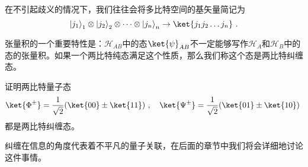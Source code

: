 在不引起歧义的情况下，我们往往会将多比特空间的基矢量简记为$$\left|j_1\right\rangle_1 \otimes\left|j_2\right\rangle_2 \otimes \cdots \otimes\left|j_n\right\rangle_n\to \ket{j_1j_2\ldots j_n}~. $$

张量积的一个重要特性是：$\mathcal{H}_{AB}$中的态$\ket{\psi}_{AB}$不一定能够写作$\mathcal{H}_A$和$\mathcal{H}_B$中的态的张量积。如果一个两比特纯态满足这个性质，那么我们称这个态是两比特纠缠态。
\begin{exercise}{}
证明两比特量子态$$\ket{\Phi^{\pm}}=\frac{1}{\sqrt{2}}(\ket{00}\pm\ket{11})~,\quad \ket{\Psi^{\pm}}=\frac{1}{\sqrt{2}}(\ket{01}\pm\ket{10})~$$
都是两比特纠缠态。
\end{exercise}

纠缠在信息的角度代表着不平凡的量子关联，在后面的章节中我们将会详细地讨论这件事情。
